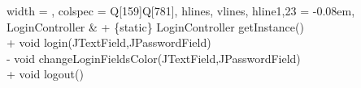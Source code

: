 \begin{longtblr}[
    label = none,
    entry = none,
  ]{
    width = \linewidth,
    colspec = {Q[159]Q[781]},
    hlines,
    vlines,
    hline{1,23} = {-}{0.08em},
  }
  LoginController        & {+ \{static\} LoginController getInstance()\\+ void login(JTextField,JPasswordField)\\- void changeLoginFieldsColor(JTextField,JPasswordField)\\+ void logout()}                                                                                                                                                                                                                                                                                                                                                                                                                                                                                                                                                                                                                                                                                                                                                                                                                                                                                                                                                                                                                                                                                                                                                                                                                                                                                                                                                                                                                                                                                                                                                                                                                                                                                                                                \\

\end{longtblr}
